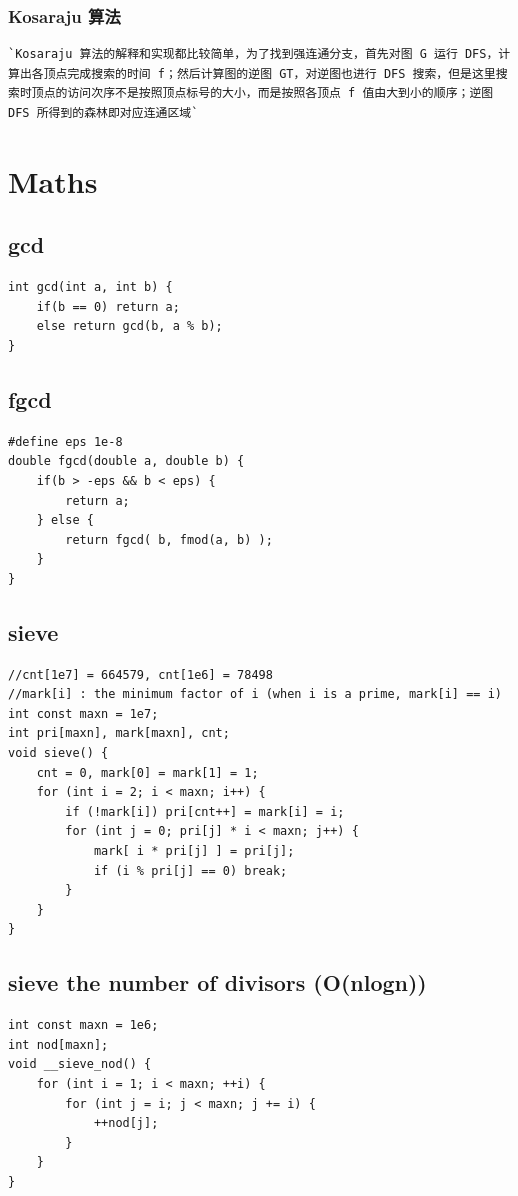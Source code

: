 \documentclass[a4paper]{article}
\begin{document}
\begin{CJK*}{UTF8}{gbsn}
\begin{multicols}{3}
\begin{flushleft}
\subsubsection{Kosaraju 算法}
\begin{lstlisting}
`Kosaraju 算法的解释和实现都比较简单，为了找到强连通分支，首先对图 G 运行 DFS，计算出各顶点完成搜索的时间 f；然后计算图的逆图 GT，对逆图也进行 DFS 搜索，但是这里搜索时顶点的访问次序不是按照顶点标号的大小，而是按照各顶点 f 值由大到小的顺序；逆图 DFS 所得到的森林即对应连通区域`
\end{lstlisting}


\section{Maths}

\subsection{gcd}
\begin{lstlisting}
int gcd(int a, int b) {
	if(b == 0) return a;
	else return gcd(b, a % b);
}
\end{lstlisting}

\subsection{fgcd}

\begin{lstlisting}
#define eps 1e-8
double fgcd(double a, double b) {
	if(b > -eps && b < eps) {
		return a;
	} else {
		return fgcd( b, fmod(a, b) );
	}
}
\end{lstlisting}

\subsection{sieve}
\begin{lstlisting}
//cnt[1e7] = 664579, cnt[1e6] = 78498
//mark[i] : the minimum factor of i (when i is a prime, mark[i] == i)
int const maxn = 1e7;
int pri[maxn], mark[maxn], cnt;
void sieve() {
	cnt = 0, mark[0] = mark[1] = 1;
	for (int i = 2; i < maxn; i++) {
		if (!mark[i]) pri[cnt++] = mark[i] = i;
		for (int j = 0; pri[j] * i < maxn; j++) {
			mark[ i * pri[j] ] = pri[j];
			if (i % pri[j] == 0) break;
		}
	}
}
\end{lstlisting}
\subsection{sieve the number of divisors (O(nlogn))}
\begin{lstlisting}
int const maxn = 1e6;
int nod[maxn];
void __sieve_nod() {
    for (int i = 1; i < maxn; ++i) {
        for (int j = i; j < maxn; j += i) {
            ++nod[j];
        }
    }
}
\end{lstlisting}


\end{flushleft}
\end{multicols}
\end{CJK*}
\end{document}
